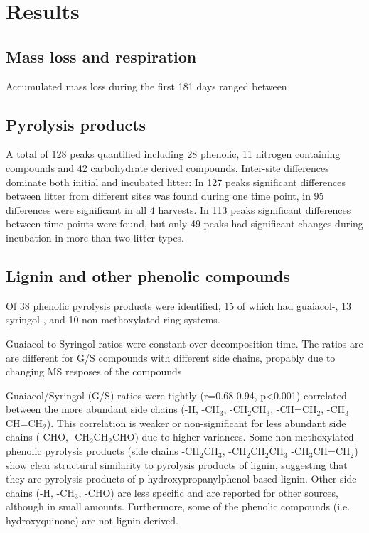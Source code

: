 \documentclass[preprint,review,12pt]{elsarticle}
\begin{document}
\section{Results}

\subsection{Mass loss and respiration}

Accumulated mass loss during the first 181 days ranged between

\subsection{Pyrolysis products}


A total of 128 peaks quantified including 28 phenolic, 11 nitrogen containing compounds and 42 carbohydrate derived compounds. Inter-site differences dominate both initial and incubated litter: In 127  peaks significant differences between litter from different sites was found during one time point, in 95 differences were significant in all 4 harvests. In 113 peaks significant differences between time points were found, but only 49 peaks had significant changes during incubation in more than two litter types.




\subsection{Lignin and other phenolic compounds}
Of 38 phenolic pyrolysis products were identified, 15 of which had guaiacol-, 13 syringol-, and 10 non-methoxylated ring systems.

Guaiacol to Syringol ratios were constant over decomposition time. The ratios are are different for G/S compounds with different side chains, propably due to changing MS resposes of the compounds

Guaiacol/Syringol (G/S) ratios were tightly (r=0.68-0.94, p<0.001) correlated between the more abundant side chains (-H, -CH$_3$, -CH$_2$CH$_3$, -CH=CH$_2$, -CH$_3$CH=CH$_2$). This correlation is weaker or non-significant for less abundant side chains (-CHO, -CH$_2$CH$_2$CHO) due to higher variances. Some non-methoxylated phenolic pyrolysis products (side chains -CH$_2$CH$_3$, -CH$_2$CH$_2$CH$_3$ -CH$_3$CH=CH$_2$) show clear structural similarity to pyrolysis products of lignin, suggesting that they are pyrolysis products of p-hydroxypropanylphenol based lignin. Other side chains (-H, -CH$_3$, -CHO) are less specific and are reported for other sources, although in small amounts. Furthermore, some of the phenolic compounds (i.e. hydroxyquinone) are not lignin derived.
\end{document}
